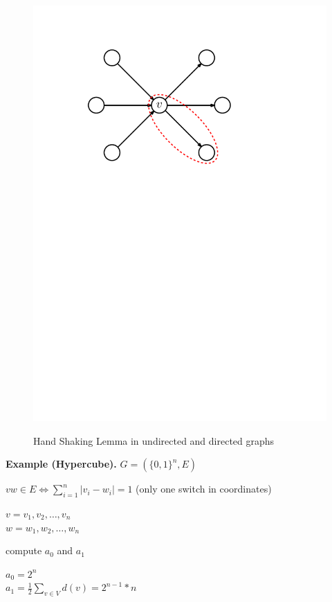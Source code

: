 \begin{figure}[htb]
{	\includegraphics[scale=.5]{01_graph_theory/pics/directed-graph_degree_handshaking-lemma.pdf}
}
\caption{Hand Shaking Lemma in undirected and directed graphs}
\label{fig:hand_shaking_lemma}
\end{figure}
\FloatBarrier

\textbf{Example (Hypercube).} 
$G = (\{0,1\}^n, E)$

$vw \in E \Leftrightarrow \sum_{i=1}^{n} |v_i - w_i | = 1$ (only one switch in coordinates)

$v = v_1, v_2, \ldots , v_n$\\
$w = w_1, w_2, \ldots , w_n$

compute $a_0$ and $a_1$

$a_0 = 2^n$ \\
$a_1 = \frac{1}{2} \sum_{v \in V} d(v) = 2^{n-1} * n$

